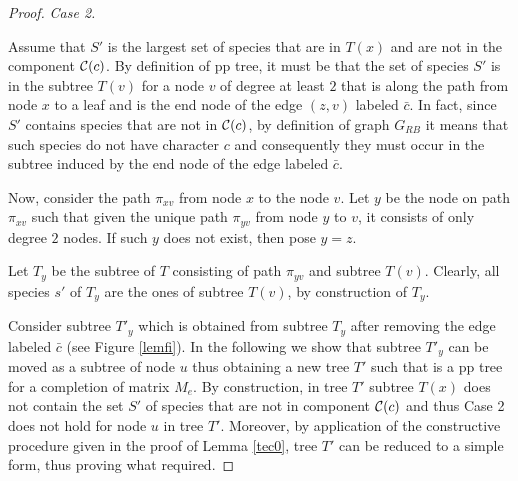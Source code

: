 \documentclass{llncs}
\begin{document}
\begin{proof}
 {\em Case 2.}
 
 Assume that $S'$ is the largest set of species that are in $T(x)$ and are not in the component 
${\cal C }(c)$. 
By definition of pp tree, it must be that the set of species $S'$ is in the subtree $T(v)$ for a node $v$ of degree at least $2$ that is along the path from node $x$ to a leaf and is the end node of  the edge $(z,v)$  labeled $\bar{c}$. In fact, since $S'$ contains species that are not in  ${\cal C}(c)$, by definition of graph $G_{RB}$ it means that such species do not have character $c$ and consequently they must occur in the subtree  induced by the end node of the edge labeled $\bar{c}$.

Now, consider the path $\pi_{xv}$ from node $x$ to the node $v$. Let $y$ be the node on path $\pi_{xv}$ such that given the unique path $\pi_{yv}$ from node $y$ to $v$, it consists of only degree $2$ nodes. If such $y$ does not exist, then pose $y=z$.

Let $T_y$ be  the subtree  of $T$ consisting of path $\pi_{yv}$ and subtree $T(v)$. Clearly, all species $s'$ of $T_y$ are the ones of subtree $T(v)$, by construction of $T_y$.

Consider subtree $T'_y$ which is obtained from subtree $T_y$ after removing the edge labeled ${\bar c}$ (see Figure \ref{lemfi}).
In the following we show that subtree $T'_y$ can be moved as a subtree of node $u$  thus obtaining a new tree $T'$ such that is a pp tree for a completion of matrix $M_e$. By construction,  in tree $T'$   subtree $T(x)$ does not contain the set $S'$ of species that  are not in component ${\cal C} (c)$ and thus Case 2 does not hold for node $u$ in tree $T'$.
 Moreover, by application of the constructive procedure given in the proof of  Lemma \ref{tec0}, tree $T'$ can be reduced to a simple form, thus proving what required.





\end{proof}
\end{document}
